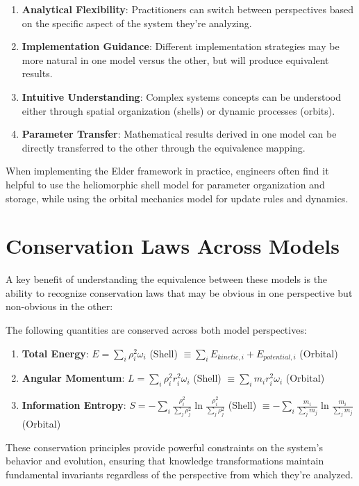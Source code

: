 \begin{enumerate}
    \item \textbf{Analytical Flexibility}: Practitioners can switch between perspectives based on the specific aspect of the system they're analyzing.
    
    \item \textbf{Implementation Guidance}: Different implementation strategies may be more natural in one model versus the other, but will produce equivalent results.
    
    \item \textbf{Intuitive Understanding}: Complex systems concepts can be understood either through spatial organization (shells) or dynamic processes (orbits).
    
    \item \textbf{Parameter Transfer}: Mathematical results derived in one model can be directly transferred to the other through the equivalence mapping.
\end{enumerate}

\begin{observation}
When implementing the Elder framework in practice, engineers often find it helpful to use the heliomorphic shell model for parameter organization and storage, while using the orbital mechanics model for update rules and dynamics.
\end{observation}

\section{Conservation Laws Across Models}

A key benefit of understanding the equivalence between these models is the ability to recognize conservation laws that may be obvious in one perspective but non-obvious in the other:

\begin{theorem}
The following quantities are conserved across both model perspectives:
\begin{enumerate}
    \item \textbf{Total Energy}: $E = \sum_i \rho_i^2\omega_i$ (Shell) $\equiv \sum_i E_{kinetic,i} + E_{potential,i}$ (Orbital)
    
    \item \textbf{Angular Momentum}: $L = \sum_i \rho_i^2 r_i^2 \omega_i$ (Shell) $\equiv \sum_i m_i r_i^2 \omega_i$ (Orbital)
    
    \item \textbf{Information Entropy}: $S = -\sum_i \frac{\rho_i^2}{\sum_j \rho_j^2}\ln\frac{\rho_i^2}{\sum_j \rho_j^2}$ (Shell) $\equiv -\sum_i \frac{m_i}{\sum_j m_j}\ln\frac{m_i}{\sum_j m_j}$ (Orbital)
\end{enumerate}
\end{theorem}

These conservation principles provide powerful constraints on the system's behavior and evolution, ensuring that knowledge transformations maintain fundamental invariants regardless of the perspective from which they're analyzed.